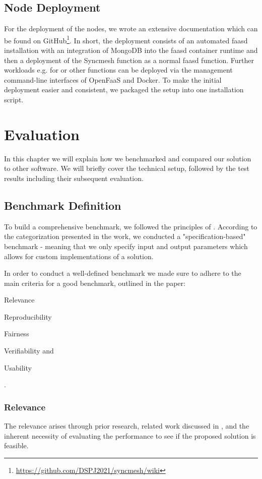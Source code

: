 \documentclass[conference]{IEEEtran}
\begin{document}
\subsection{Node Deployment}
For the deployment of the nodes, we wrote an extensive documentation which can be found on GitHub\footnote{\url{https://github.com/DSPJ2021/syncmesh/wiki}}. In short, the deployment consists of an automated faasd installation with an integration of MongoDB into the faasd container runtime and then a deployment of the Syncmesh function as a normal faasd function. Further workloads e.g. for  or other functions can be deployed via the management command-line interfaces of OpenFaaS and Docker. To make the initial deployment easier and consistent, we packaged the setup into one installation script.


\section{Evaluation}\label{Chap:Eva}

In this chapter we will explain how we benchmarked and compared our solution to other software. We will briefly cover the technical setup, followed by the test results including their subsequent evaluation.

\subsection{Benchmark Definition}\label{Section:Benchmark}
To build a comprehensive benchmark, we followed the principles of  \cite{Kistowski2015HowBenchmark}. According to the categorization presented in the work, we conducted a "specification-based" \cite{Kistowski2015HowBenchmark} benchmark - meaning that we only specify input and output parameters which allows for custom implementations of a solution.  

In order to conduct a well-defined benchmark we made sure to adhere to the main criteria for a good benchmark, outlined in the paper: 
\begin{enumerate*}
    \item Relevance
    \item Reproducibility
    \item Fairness
    \item Verifiability and
    \item Usability
\end{enumerate*}.

\subsubsection{Relevance}
The relevance arises through prior research, related work discussed in , and the inherent necessity of evaluating the performance to see if the proposed solution is feasible.
\end{document}
